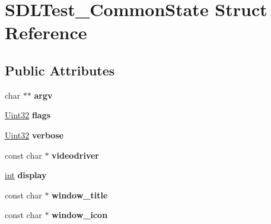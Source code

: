\hypertarget{structSDLTest__CommonState}{}\section{S\+D\+L\+Test\+\_\+\+Common\+State Struct Reference}
\label{structSDLTest__CommonState}
\subsection*{Public Attributes}
\begin{DoxyCompactItemize}
\item 
\hypertarget{structSDLTest__CommonState_a6db840410b86ab7c6807763fd8bcb081}{}char $\ast$$\ast$ {\bfseries argv}\label{structSDLTest__CommonState_a6db840410b86ab7c6807763fd8bcb081}

\item 
\hypertarget{structSDLTest__CommonState_a97272d03558f1f74e579ec8a5cdabc5e}{}\hyperlink{SDL__stdinc_8h_add440eff171ea5f55cb00c4a9ab8672d}{Uint32} {\bfseries flags}\label{structSDLTest__CommonState_a97272d03558f1f74e579ec8a5cdabc5e}

\item 
\hypertarget{structSDLTest__CommonState_aad4b8ebf6277cd9d3608d2e1b48e4678}{}\hyperlink{SDL__stdinc_8h_add440eff171ea5f55cb00c4a9ab8672d}{Uint32} {\bfseries verbose}\label{structSDLTest__CommonState_aad4b8ebf6277cd9d3608d2e1b48e4678}

\item 
\hypertarget{structSDLTest__CommonState_ab3face917946465c60dc0f38f179534d}{}const char $\ast$ {\bfseries videodriver}\label{structSDLTest__CommonState_ab3face917946465c60dc0f38f179534d}

\item 
\hypertarget{structSDLTest__CommonState_addb3de8e2b278deed8d2309bafd30758}{}\hyperlink{SDL__thread_8h_a6a64f9be4433e4de6e2f2f548cf3c08e}{int} {\bfseries display}\label{structSDLTest__CommonState_addb3de8e2b278deed8d2309bafd30758}

\item 
\hypertarget{structSDLTest__CommonState_a86640ebac0afe0c504c3c324d84dcc37}{}const char $\ast$ {\bfseries window\+\_\+title}\label{structSDLTest__CommonState_a86640ebac0afe0c504c3c324d84dcc37}

\item 
\hypertarget{structSDLTest__CommonState_ac9e981b2b60a59f995153c74242d9d43}{}const char $\ast$ {\bfseries window\+\_\+icon}\label{structSDLTest__CommonState_ac9e981b2b60a59f995153c74242d9d43}


\end{DoxyCompactItemize}
